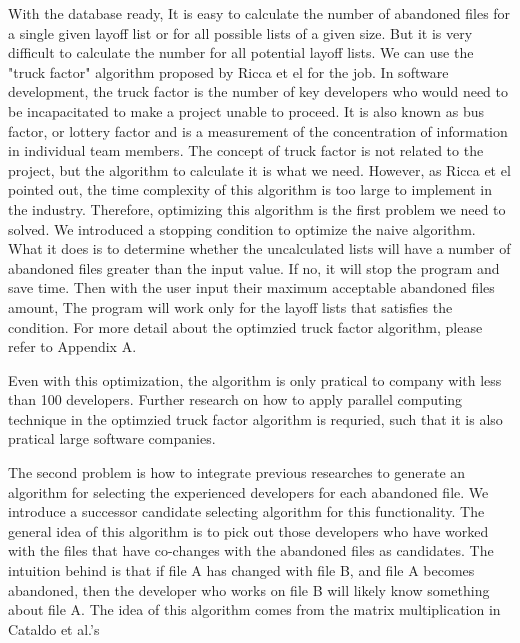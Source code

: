 \documentclass[11pt, a4paper, openright]{report}
\begin{document}
With the database ready, It is easy to calculate the number of abandoned files for a single given layoff list or for all possible lists of a given size. But it is very difficult to calculate the number for all potential layoff lists. 
We can use the "truck factor" algorithm proposed by Ricca et el \cite{Ricca2011PROFES} for the job. In software development, the truck factor is the number of key developers who would need to be incapacitated to make a project unable to proceed. It is also known as bus factor, or lottery factor and is a measurement of the concentration of information in individual team members. The concept of truck factor is not related to the project, but the algorithm to calculate it is what we need. However, as Ricca et el pointed out\cite{Ricca2011PROFES}, the time complexity of this algorithm is too large to implement in the industry. Therefore, optimizing this algorithm is the first problem we need to solved. We introduced a stopping condition to optimize the naive algorithm. What it does is to determine whether the uncalculated lists will have a number of abandoned files greater than the input value. If no, it will stop the program and save time. Then with the user input their maximum acceptable abandoned files amount, The program will work only for the layoff lists that satisfies the condition. For more detail about the optimzied truck factor algorithm, please refer to Appendix A.  


Even with this optimization, the algorithm is only pratical to company with less than 100 developers. Further research on how to apply parallel computing technique in the optimzied truck factor algorithm is requried, such that it is also pratical large software companies.


The second problem is how to integrate previous researches to generate an algorithm for selecting the experienced developers for each abandoned file. We introduce a successor candidate selecting algorithm for this functionality. The general idea of this algorithm is to pick out those developers who have worked with the files that have co-changes with the abandoned files as candidates. The intuition behind is that if file A has changed with file B, and file A becomes abandoned, then the developer who works on file B will likely know something about file A. The idea of this algorithm comes from the matrix multiplication in Cataldo et al.'s\cite{Cataldo2006CSCW}
\end{document}
